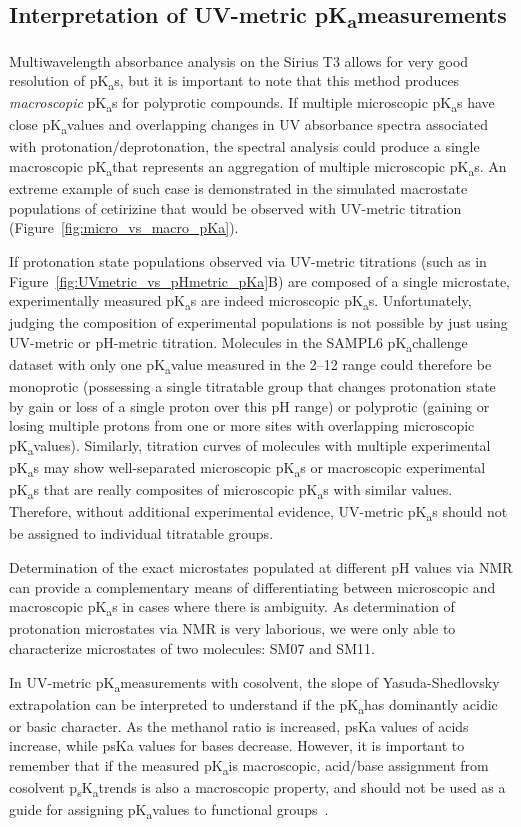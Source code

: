 \documentclass[9pt,lineno]{elife}
\newcommand{\pKa}{pK\textsubscript{a}}
\newcommand{\psKa}{p\textsubscript{s}K\textsubscript{a}}
\begin{document}
\subsection{Interpretation of UV-metric \pKa measurements}

Multiwavelength absorbance analysis on the Sirius T3 allows for very good resolution of \pKa s, but it is important to note that this method produces \emph{macroscopic} \pKa s for polyprotic compounds. 
If multiple microscopic \pKa s have close \pKa values and overlapping changes in UV absorbance spectra associated with protonation/deprotonation, the spectral analysis could produce a single macroscopic \pKa that represents an aggregation of multiple microscopic \pKa s. 
An extreme example of such case is demonstrated in the simulated macrostate populations of cetirizine that would be observed with UV-metric titration (Figure~\ref{fig:micro_vs_macro_pKa}).

If protonation state populations observed via UV-metric titrations (such as in Figure~\ref{fig:UVmetric_vs_pHmetric_pKa}B) are composed of a single microstate, experimentally measured \pKa s are indeed microscopic \pKa s.  
Unfortunately, judging the composition of experimental populations is not possible by just using UV-metric or pH-metric titration. 
Molecules in the SAMPL6 \pKa challenge dataset with only one \pKa value measured in the 2--12 range could therefore be monoprotic (possessing a single titratable group that changes protonation state by gain or loss of a single proton over this pH range) or polyprotic (gaining or losing multiple protons from one or more sites with overlapping microscopic \pKa values). 
Similarly, titration curves of molecules with multiple experimental \pKa s may show well-separated microscopic \pKa s or macroscopic experimental \pKa s that are really composites of microscopic \pKa s with similar values. 
Therefore, without additional experimental evidence, UV-metric \pKa s should not be assigned to individual titratable groups. 

Determination of the exact microstates populated at different pH values via NMR can provide a complementary means of differentiating between microscopic and macroscopic \pKa s in cases where there is ambiguity.
As determination of protonation microstates via NMR is very laborious, we were only able to characterize microstates of two molecules: SM07 and SM11. 

In UV-metric \pKa measurements with cosolvent, the slope of Yasuda-Shedlovsky extrapolation can be interpreted to understand if the \pKa has dominantly acidic or basic character. 
As the methanol ratio is increased, psKa values of acids increase, while psKa values for bases decrease. 
However, it is important to remember that if the measured \pKa is macroscopic, acid/base assignment from cosolvent \psKa trends is also a macroscopic property, and should not be used as a guide for assigning \pKa values to functional groups~\citep{fraczkiewicz_silico_2013}.
\end{document}
